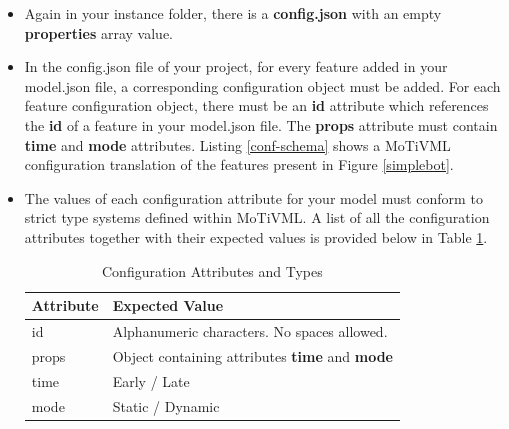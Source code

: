 \documentclass{article}
\begin{document}
\begin{itemize}
	\item Again in your instance folder, there is a \textbf{config.json} with an empty \textbf{properties} array value.
	
	\item In the config.json file of your project, for every feature added in your model.json file, a corresponding configuration object must be added. For each feature configuration object, there must be an \textbf{id} attribute which references the \textbf{id} of a feature in your model.json file. The \textbf{props} attribute must contain \textbf{time} and \textbf{mode} attributes.  Listing \ref{conf-schema} shows a MoTiVML configuration translation of the features present in Figure \ref{simplebot}.
	
	\item The values of each configuration attribute for your model must conform to strict type systems defined within MoTiVML. A list of all the configuration attributes together with their expected values is provided below in Table \ref{tab:confvalueTypes}.
	
	\begin{table}[H]
		\caption{Configuration Attributes and Types}
		\begin{tabular}{|l|p{10cm}|}
			\hline
			Attribute & Expected Value \\\hline
			id & Alphanumeric characters. No spaces allowed.   \\ \hline
			props & Object containing attributes \textbf{time} and \textbf{mode} \\ \hline
			time & Early / Late  \\ \hline
			mode & Static / Dynamic \\ \hline
		\end{tabular}
		\label{tab:confvalueTypes}
	\end{table}
	
\end{itemize}
\end{document}
